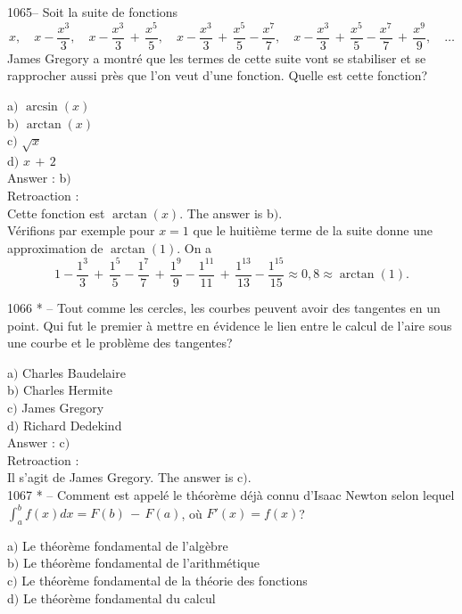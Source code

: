 ﻿\documentclass[letterpaper, 12pt]{article}
\begin{document}
1065-- Soit la suite de fonctions
$$\displaystyle{x,\quad x-\frac{x^3}3,\quad
x-\frac{x^3}3\,+\,\frac{x^5}5,\quad
x-\frac{x^3}3\,+\,\frac{x^5}5-\frac{x^7}7,\quad
x-\frac{x^3}3\,+\,\frac{x^5}5-\frac{x^7}7\,+\,\frac{x^9}9,\quad\ldots}$$
James Gregory a montr\'e que les termes de cette suite vont se
stabiliser et se rapprocher aussi pr\`es que l'on veut d'une
fonction. Quelle est cette fonction?

a$)$ $\arcsin(x)$ \\
b$)$ $\arctan(x)$  \\
c$)$ $\sqrt x$  \\
d$)$ $x\,+\,2$\\

Answer : b$)$\\

Retroaction : \\
Cette fonction est $\arctan(x)$. The answer is b$)$.\\
V\'erifions par exemple pour $x=1$ que le huiti\`eme terme de la
suite donne une approximation de $\arctan(1)$. On a
$$1-\frac{1^3}3\,+\,\frac{1^5}5-\frac{1^7}7\,+\,\frac{1^9}9-\frac{1^{11}}{11}\,+\,\frac{1^{13}}{13}-\frac{1^{15}}{15}\approx0,8\approx\arctan(1).$$


1066 * -- Tout comme les cercles, les courbes peuvent avoir des
tangentes en un point. Qui fut le premier \`a mettre en \'evidence
le lien entre le calcul de l'aire sous une courbe et le probl\`eme
des tangentes?

a$)$ Charles Baudelaire \\
b$)$ Charles Hermite \\
c$)$ James Gregory  \\
d$)$ Richard Dedekind \\

Answer : c$)$ \\

Retroaction : \\
Il s'agit de James Gregory.
The answer is c$)$.\\

1067 * -- Comment est appel\'e le th\'eor\`eme d\'ej\`a connu
d'Isaac Newton selon lequel $\int_a^bf(x)dx=F(b)\,-\,F(a)$, o\`u
$F'(x)=f(x)$?

a$)$ Le th\'eor\`eme fondamental de l'alg\`ebre \\
b$)$ Le th\'eor\`eme fondamental de l'arithm\'etique  \\
c$)$ Le th\'eor\`eme fondamental de la th\'eorie des fonctions  \\
d$)$ Le th\'eor\`eme fondamental du calcul\\
\end{document}
